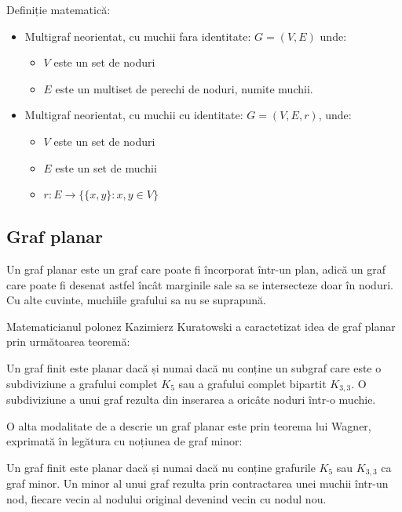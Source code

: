 Definiție matematică:\newline

\begin{itemize}
\item Multigraf neorientat, cu muchii fara identitate: 
\(G=(V,E)\) unde:
\begin{itemize}
    \item \(V\) este un set de noduri 
    \item \(E\) este un multiset de perechi de noduri, numite muchii.
\end{itemize}

    
\item Multigraf neorientat, cu muchii cu identitate:
\(G=(V,E,r)\), unde:
\begin{itemize}
    \item \(V\) este un set de noduri
    \item \(E\) este un set de muchii
    \item \(r : E → \{\{x,y\} : x, y \in V\}\)
\end{itemize}

\end{itemize}

\subsection{Graf planar}

Un graf planar este un graf care poate fi încorporat într-un plan, adică un graf care poate fi desenat astfel încât 
marginile sale sa se intersecteze doar în noduri. Cu alte cuvinte, muchiile grafului sa nu se suprapună.\newline

Matematicianul polonez Kazimierz Kuratowski a caractetizat idea de graf planar prin următoarea teoremă:\newline

Un graf finit este planar dacă și numai dacă nu conține un subgraf care este o subdiviziune a grafului complet \(K_5\) sau a grafului complet bipartit \(K_{3,3}\).
O subdiviziune a unui graf rezulta din inserarea a oricâte noduri într-o muchie.\newline

O alta modalitate de a descrie un graf planar este prin teorema lui Wagner, exprimată în legătura cu noțiunea de graf minor:\newline
 
Un graf finit este planar dacă și numai dacă nu conține grafurile \(K_5\) sau \(K_{3,3}\) ca graf minor.
Un minor al unui graf rezulta prin contractarea unei muchii într-un nod, fiecare vecin al nodului original devenind vecin cu nodul nou.\newline

